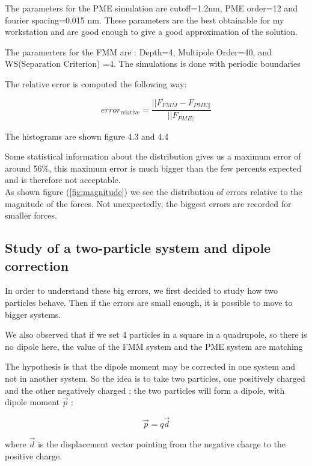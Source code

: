 \documentclass[10pt,twoside,a4paper]{report}
\begin{document}
The parameters for the PME simulation are cutoff=1.2nm, PME order=12 and fourier spacing=0.015 nm. These parameters are the best obtainable for my workstation and are good enough to give a good approximation of the solution.

The paramerters for the FMM are : Depth=4, Multipole Order=40, and WS(Separation Criterion) =4. The simulations is done with periodic boundaries 

The relative error is computed the following way:

\begin{equation}
	error_{\text{relative}} = \frac{||F_{FMM} - F_{PME||}}{||F_{PME||}}
\end{equation}

The histograms are shown figure 4.3 and 4.4


	Some statistical information about the distribution gives us a maximum error of around 56\%, this maximum error is much bigger than the few percents expected and is therefore not acceptable.\\
	
	As shown figure (\ref{fig:magnitude}) we see the distribution of errors relative to the magnitude of the forces. Not unexpectedly, the biggest errors are recorded for smaller forces.

\subsection{Study of a two-particle system and dipole correction}
	In order to understand these big errors, we first decided to study how two particles behave. Then if the errors are small enough, it is possible to move to bigger systems.
	
We also observed that if we set 4 particles in a square in a quadrupole, so there is no dipole here, the value of the FMM system and the PME system are matching




 	
	
The hypothesis is that the dipole moment may be corrected in one system and not in another system. So the idea is to take two particles, one positively charged and the other negatively charged ; the two particles will form a dipole, with dipole moment $\vec{p}$ : 

\begin{equation}
	\vec{p} = q \vec{d}
\end{equation}	
	
	where $\vec{d}$ is the displacement vector pointing from the negative charge to the positive charge. 
	
\end{document}
